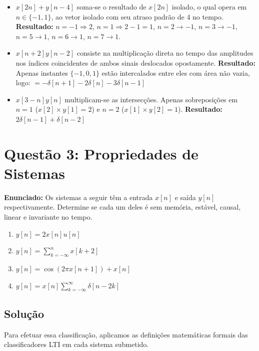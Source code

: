 \documentclass[tcc]{classe_uftex/uftex}
\begin{document}
\begin{itemize}
    \item[\textbf{f)}] $x[2n] + y[n-4]$ soma-se o resultado de $x[2n]$ isolado, o qual opera em $n \in \{-1, 1\}$, ao vetor isolado com seu atraso padrão de 4 no tempo.
    \textbf{Resultado:} $n=-1 \Rightarrow 2$, \quad $n=1 \Rightarrow 2 - 1 = 1$, \quad $n=2 \to -1$, \quad $n=3 \to -1$, \quad $n=5 \to 1$, \quad $n=6 \to 1$, \quad $n=7 \to 1$.

    \item[\textbf{g)}] $x[n+2]y[n-2]$ consiste na multiplicação direta no tempo das amplitudes nos índices coincidentes de ambos sinais deslocados opostamente.
    \textbf{Resultado:} Apenas instantes $\{-1, 0, 1\}$ estão intercalados entre eles com área não vazia, logo: $= -\delta[n+1] -2\delta[n] -3\delta[n-1]$

    \item[\textbf{h)}] $x[3-n]y[n]$ multiplicam-se as intersecções. Apenas sobreposições em $n=1$ ($x[2] \times y[1] = 2$) e $n=2$ ($x[1] \times y[2] = 1$).
    \textbf{Resultado:} $2\delta[n-1] + \delta[n-2]$
\end{itemize}

\section{Questão 3: Propriedades de Sistemas}

\textbf{Enunciado:} Os sistemas a seguir têm a entrada $x[n]$ e saída $y[n]$ respectivamente. Determine se cada um deles é sem memória, est\'avel, causal, linear e invariante no tempo.

\begin{enumerate}
    \item[\textbf{a)}] $y[n] = 2x[n]u[n]$
    \item[\textbf{b)}] $y[n] = \sum_{k=-\infty}^{n} x[k+2]$
    \item[\textbf{c)}] $y[n] = \cos(2\pi x[n+1]) + x[n]$
    \item[\textbf{d)}] $y[n] = x[n] \sum_{k=-\infty}^{\infty} \delta[n-2k]$
\end{enumerate}

\subsection*{Solução}

Para efetuar essa classificação, aplicamos as definições matemáticas formais das classificadores LTI em cada sistema submetido.
\end{document}
